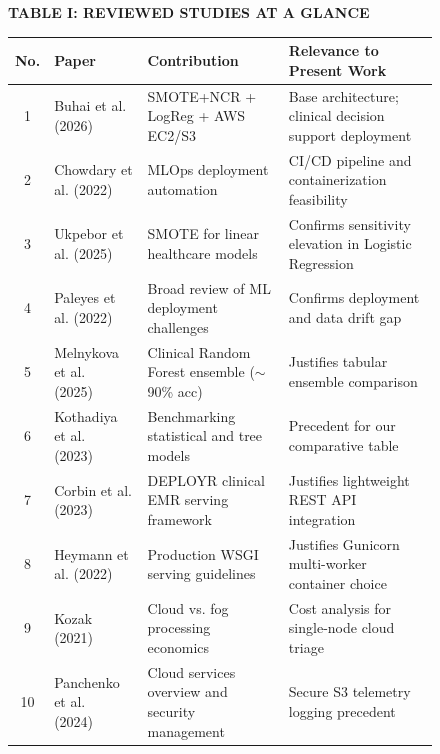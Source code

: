\documentclass[10pt,twocolumn,a4paper]{article}
\begin{document}
\begin{figure}[t]
\centering
\small
\textbf{TABLE I: REVIEWED STUDIES AT A GLANCE}\\[4pt]
\begin{tabular}{|c|p{4.2cm}|p{6.0cm}|p{6.2cm}|}
\hline
\textbf{No.} & \textbf{Paper} & \textbf{Contribution} & \textbf{Relevance to Present Work} \\
\hline
1 & Buhai et al. (2026)~\cite{buhai2026} & SMOTE+NCR + LogReg + AWS EC2/S3 & Base architecture; clinical decision support deployment \\
\hline
2 & Chowdary et al. (2022)~\cite{chowdary2022} & MLOps deployment automation & CI/CD pipeline and containerization feasibility \\
\hline
3 & Ukpebor et al. (2025)~\cite{ukpebor2025} & SMOTE for linear healthcare models & Confirms sensitivity elevation in Logistic Regression \\
\hline
4 & Paleyes et al. (2022)~\cite{paleyes2022} & Broad review of ML deployment challenges & Confirms deployment and data drift gap \\
\hline
5 & Melnykova et al. (2025)~\cite{melnykova2025} & Clinical Random Forest ensemble ($\sim$90\% acc) & Justifies tabular ensemble comparison \\
\hline
6 & Kothadiya et al. (2023)~\cite{kothadiya2023} & Benchmarking statistical and tree models & Precedent for our comparative table \\
\hline
7 & Corbin et al. (2023)~\cite{corbin2023} & DEPLOYR clinical EMR serving framework & Justifies lightweight REST API integration \\
\hline
8 & Heymann et al. (2022)~\cite{heymann2022} & Production WSGI serving guidelines & Justifies Gunicorn multi-worker container choice \\
\hline
9 & Kozak (2021)~\cite{kozak2021} & Cloud vs. fog processing economics & Cost analysis for single-node cloud triage \\
\hline
10 & Panchenko et al. (2024)~\cite{panchenko2024} & Cloud services overview and security management & Secure S3 telemetry logging precedent \\
\hline
\end{tabular}
\label{tab:reviewed_studies}
\end{figure}
\end{document}

